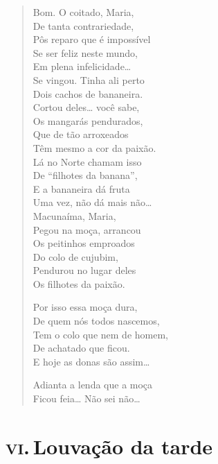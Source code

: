 \begin{verse}
Bom. O coitado, Maria,\\
De tanta contrariedade,\\
Pôs reparo que é impossível\\
Se ser feliz neste mundo,\\
Em plena infelicidade\ldots{}\\
Se vingou. Tinha ali perto\\
Dois cachos de bananeira.\\
Cortou deles\ldots{} você sabe,\\
Os mangarás pendurados,\\
Que de tão arroxeados\\
Têm mesmo a cor da paixão.\\
Lá no Norte chamam isso\\
De ``filhotes da banana'',\\
E a bananeira dá fruta\\
Uma vez, não dá mais não\ldots{}\\
Macunaíma, Maria,\\
Pegou na moça, arrancou\\
Os peitinhos emproados\\
Do colo de cujubim,\\
Pendurou no lugar deles\\
Os filhotes da paixão.

Por isso essa moça dura,\\
De quem nós todos nascemos,\\
Tem o colo que nem de homem,\\
De achatado que ficou.\\
E hoje as donas são assim\ldots{}

Adianta a lenda que a moça\\
Ficou feia\ldots{} Não sei não\ldots{}
\end{verse}

\pagebreak
\section*{\textsc{vi}.\,Louvação da tarde}

